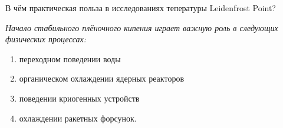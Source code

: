 \begin{frame}{В чём практическая польза в исследованиях тепературы Leidenfrost Point?}
\vspace{0.30cm}
\begin{block}{}
\textsl{\Large Начало стабильного плёночного кипения играет важную роль в следующих физических процессах:}
\end{block}
 \vspace{0.25cm}
\renewcommand{\labelenumii}{\arabic{enumi}.\arabic{enumii}.}
\begin{enumerate} 
\large
    \item 

 переходном поведении воды 
 \vspace{0.15cm}
 \item органическом охлаждении ядерных реакторов 
 \vspace{0.15cm}
 \item поведении криогенных устройств 
 \vspace{0.15cm}
 \item охлаждении ракетных форсунок.\\   
 \vspace{0.15cm}
\end{enumerate}
\end{frame}